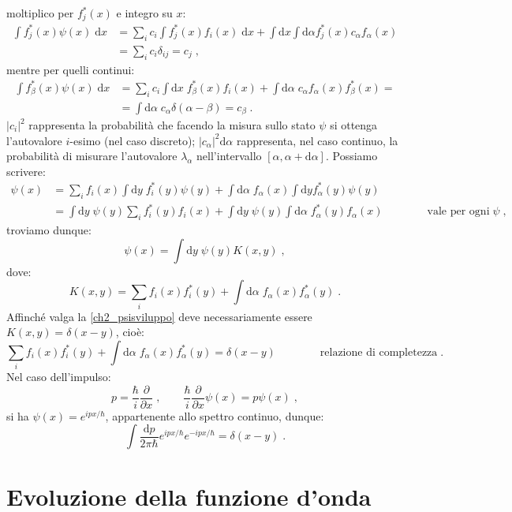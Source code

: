 \documentclass[12pt,a4paper]{report}
\theoremstyle{definition}
\numberwithin{equation}{section}
\newcommand{\diff}[1][]{\mathrm{d}#1}
\begin{document}
moltiplico per $f_j^*(x)$ e integro su $x$:
\begin{align*}
\int f_j^*(x)\psi(x)\;\diff{x}&= \sum_i c_i\int f_j^*(x)f_i(x)\;\diff{x}+\int\diff{x}\int\diff{\alpha}f_j^*(x)
c_\alpha f_{\alpha}(x) \\
&= \sum_i c_i\delta_{ij}= c_j\;,
\end{align*}
mentre per quelli continui:
\begin{align*}
\int f_{\beta}^*(x)\psi(x)\;\diff{x} &= \sum_i c_i\int\diff{x}\;f_{\beta}^*(x)f_i(x)+\int\diff{\alpha}\;c_{\alpha}f_{\alpha}(x)f_{\beta}^*(x)= \\
&= \int\diff{\alpha}\;c_{\alpha}\delta(\alpha-\beta)=c_{\beta}\;.
\end{align*}
$|c_i|^2$ rappresenta la probabilità che facendo la misura sullo stato $\psi$ si ottenga l'autovalore $i$-esimo (nel caso discreto); $|c_{\alpha}|^2\diff{\alpha}$ rappresenta, nel caso continuo, la probabilità di misurare l'autovalore $\lambda_{\alpha}$ nell'intervallo $[\alpha,\alpha+\diff{\alpha}]$. Possiamo scrivere:
\begin{align*}
\psi(x)&= \sum_i f_i(x)\int\diff{y}\;f_i^*(y)\psi(y)+\int\diff{\alpha}\;f_{\alpha}(x)\int\diff{y}f_{\alpha}^*(y)\psi(y) \\
&= \int\diff{y}\;\psi(y)\sum_i f_i^*(y)f_i(x)+\int\diff{y}\;\psi(y)\int\diff{\alpha}\;f_{\alpha}^*(y)f_{\alpha}(x) \qquad\qquad \mbox{vale per ogni}\; \psi\;,
\end{align*}
troviamo dunque:
\begin{equation}
\psi(x)=\int\diff{y}\;\psi(y)K(x,y)\;,
\end{equation}
dove:
$$
K(x,y)=\sum_i f_i(x)f_i^*(y)+\int\diff{\alpha}\;f_{\alpha}(x)f_{\alpha}^*(y)\;.
$$
Affinché valga la \eqref{ch2_psisviluppo} deve necessariamente essere $K(x,y)=\delta(x-y)$, cioè:
\begin{equation}
\sum_i f_i(x)f_i^*(y)+\int\diff{\alpha}\;f_{\alpha}(x)f_{\alpha}^*(y)=\delta(x-y)\qquad\qquad\mbox{relazione di completezza}\;.
\end{equation}
Nel caso dell'impulso:
$$
p=\frac{\hbar}{i}\frac{\partial}{\partial x}\;, \qquad \frac{\hbar}{i}\frac{\partial}{\partial x}\psi(x)=p\psi(x)\;,
$$
si ha $\psi(x)=e^{ipx/\hbar}$, appartenente allo spettro continuo, dunque:
\begin{equation}
\int\frac{\diff{p}}{2\pi\hbar}e^{ipx/\hbar}e^{-ipx/\hbar}=\delta(x-y)\;.
\end{equation}

\section{Evoluzione della funzione d'onda}
\end{document}
